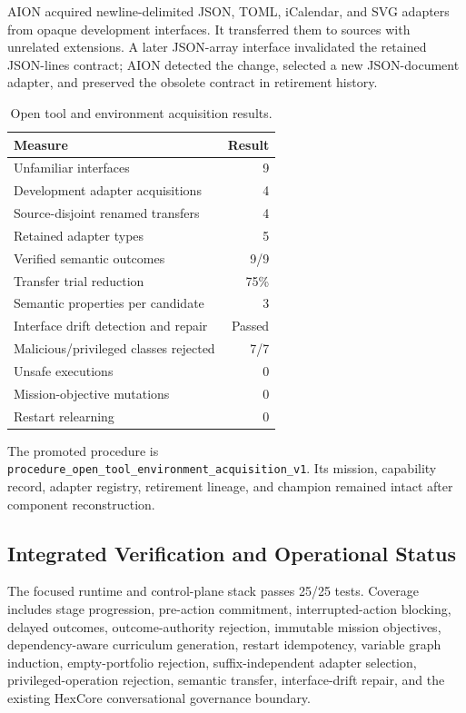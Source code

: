 AION acquired newline-delimited JSON, TOML, iCalendar, and SVG adapters from
opaque development interfaces.  It transferred them to sources with unrelated
extensions.  A later JSON-array interface invalidated the retained JSON-lines
contract; AION detected the change, selected a new JSON-document adapter, and
preserved the obsolete contract in retirement history.

\begin{table}[htbp]
\centering
\caption{Open tool and environment acquisition results.}
\label{tab:open-tool-acquisition}
\begin{tabular}{@{}lr@{}}
\toprule
Measure & Result \\
\midrule
Unfamiliar interfaces & 9 \\
Development adapter acquisitions & 4 \\
Source-disjoint renamed transfers & 4 \\
Retained adapter types & 5 \\
Verified semantic outcomes & 9/9 \\
Transfer trial reduction & 75\% \\
Semantic properties per candidate & 3 \\
Interface drift detection and repair & Passed \\
Malicious/privileged classes rejected & 7/7 \\
Unsafe executions & 0 \\
Mission-objective mutations & 0 \\
Restart relearning & 0 \\
\bottomrule
\end{tabular}
\end{table}

The promoted procedure is
\texttt{procedure\_open\_tool\_environment\_acquisition\_v1}.  Its mission,
capability record, adapter registry, retirement lineage, and champion remained
intact after component reconstruction.

\subsection{Integrated Verification and Operational Status}

The focused runtime and control-plane stack passes 25/25 tests.  Coverage
includes stage progression, pre-action commitment, interrupted-action blocking,
delayed outcomes, outcome-authority rejection, immutable mission objectives,
dependency-aware curriculum generation, restart idempotency, variable graph
induction, empty-portfolio rejection, suffix-independent adapter selection,
privileged-operation rejection, semantic transfer, interface-drift repair, and
the existing HexCore conversational governance boundary.

